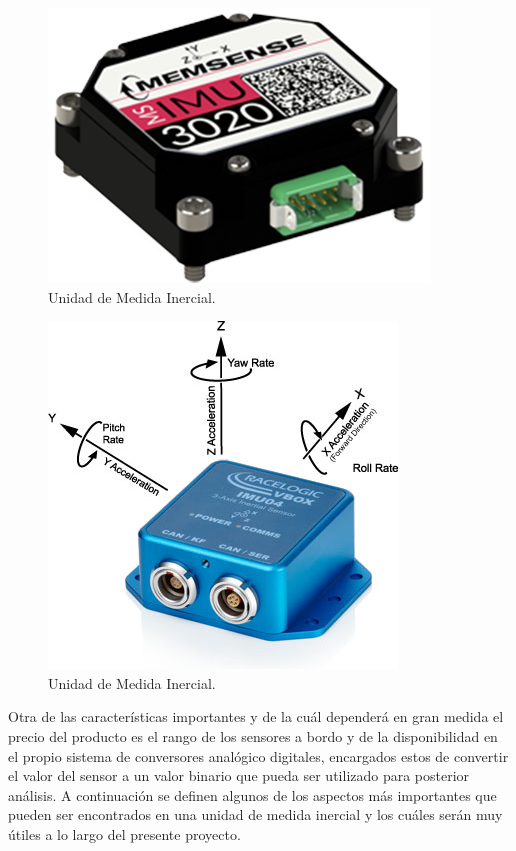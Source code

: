 \begin{figure}[H]
	\center
	\includegraphics[scale=0.2]{imagenes/Balancing_robot/IMU2}
	\caption{Unidad de Medida Inercial.}
	\label{fig:IMU2}
\end{figure}

\begin{figure}[H]
	\center
	\includegraphics[scale=0.2]{imagenes/Balancing_robot/IMU3}
	\caption{Unidad de Medida Inercial.}
	\label{fig:IMU3}
\end{figure}

Otra de las características importantes y de la cuál dependerá en gran medida el precio del producto es el rango de los sensores a bordo y de la disponibilidad en el propio sistema de conversores analógico digitales, encargados estos de convertir el valor del sensor a un valor binario que pueda ser utilizado para posterior análisis. \newline
A continuación se definen algunos de los aspectos más importantes que pueden ser encontrados en una unidad de medida inercial y los cuáles serán muy útiles a lo largo del presente proyecto.

